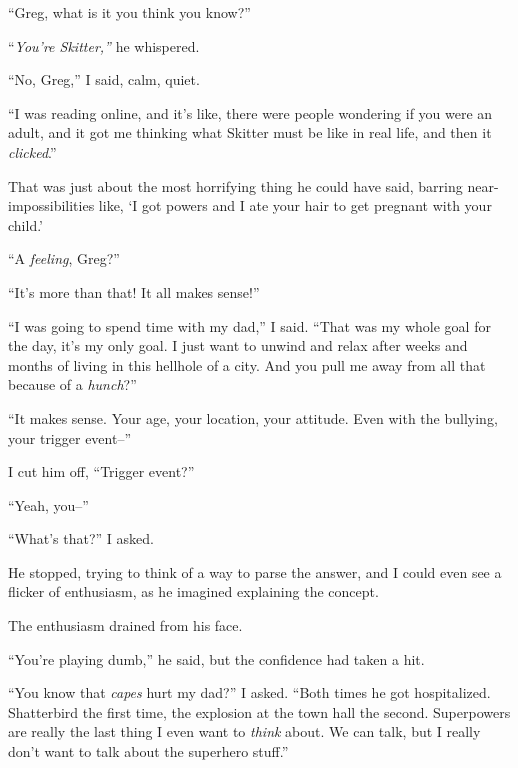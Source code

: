 ``Greg, what is it you think you know?''



``\emph{You're Skitter,'' }he whispered.



``No, Greg,'' I said, calm, quiet.



``I was reading online, and it's like, there were people wondering if you were an adult, and it got me thinking what Skitter must be like in real life, and then it \emph{clicked}.''



That was just about the most horrifying thing he could have said, barring near-impossibilities like, `I got powers and I ate your hair to get pregnant with your child.'



``A \emph{feeling}, Greg?''



``It's more than that!  It all makes sense!''



``I was going to spend time with my dad,'' I said.  ``That was my whole goal for the day, it's my only goal.  I just want to unwind and relax after weeks and months of living in this hellhole of a city.  And you pull me away from all that because of a \emph{hunch}?''



``It makes sense.  Your age, your location, your attitude.  Even with the bullying, your trigger event--''



I cut him off, ``Trigger event?''



``Yeah, you--''



``What's that?'' I asked.



He stopped, trying to think of a way to parse the answer, and I could even see a flicker of enthusiasm, as he imagined explaining the concept.



The enthusiasm drained from his face.



``You're playing dumb,'' he said, but the confidence had taken a hit.



``You know that \emph{capes} hurt my dad?'' I asked.  ``Both times he got hospitalized.  Shatterbird the first time, the explosion at the town hall the second.   Superpowers are really the last thing I even want to \emph{think} about.  We can talk, but I really don't want to talk about the superhero stuff.''



